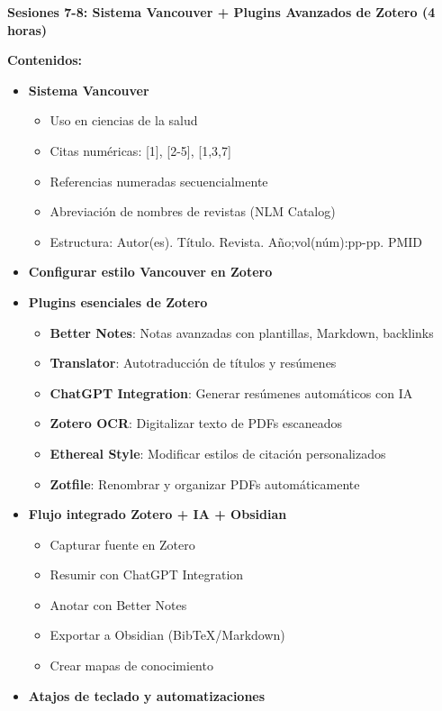 \documentclass[12pt,a4paper]{yaac-luatex}
\newcommand{\subsecciontitulo}[1]{
	{\color{maincolor}\large\bfseries #1}
}
\begin{document}
	\begin{tcolorbox}[
		enhanced,
		colback=white,
		colframe=curso2color,
		arc=3pt,
		boxrule=1.5pt,
		left=10pt,
		right=10pt,
		top=8pt,
		bottom=8pt,
		breakable
		]
		\subsecciontitulo{Sesiones 7-8: Sistema Vancouver + Plugins Avanzados de Zotero (4 horas)}
		
		\textbf{Contenidos:}
		\begin{itemize}[leftmargin=*, itemsep=0.1cm]
			\item \textbf{Sistema Vancouver}
			\begin{itemize}
				\item Uso en ciencias de la salud
				\item Citas numéricas: [1], [2-5], [1,3,7]
				\item Referencias numeradas secuencialmente
				\item Abreviación de nombres de revistas (NLM Catalog)
				\item Estructura: Autor(es). Título. Revista. Año;vol(núm):pp-pp. PMID
			\end{itemize}
			\item \textbf{Configurar estilo Vancouver en Zotero}
			\item \textbf{Plugins esenciales de Zotero}
			\begin{itemize}
				\item \textbf{Better Notes}: Notas avanzadas con plantillas, Markdown, backlinks
				\item \textbf{Translator}: Autotraducción de títulos y resúmenes
				\item \textbf{ChatGPT Integration}: Generar resúmenes automáticos con IA
				\item \textbf{Zotero OCR}: Digitalizar texto de PDFs escaneados
				\item \textbf{Ethereal Style}: Modificar estilos de citación personalizados
				\item \textbf{Zotfile}: Renombrar y organizar PDFs automáticamente
			\end{itemize}
			\item \textbf{Flujo integrado Zotero + IA + Obsidian}
			\begin{itemize}
				\item Capturar fuente en Zotero
				\item Resumir con ChatGPT Integration
				\item Anotar con Better Notes
				\item Exportar a Obsidian (BibTeX/Markdown)
				\item Crear mapas de conocimiento
			\end{itemize}
			\item \textbf{Atajos de teclado y automatizaciones}
		\end{itemize}
		

\end{tcolorbox}
\end{document}
